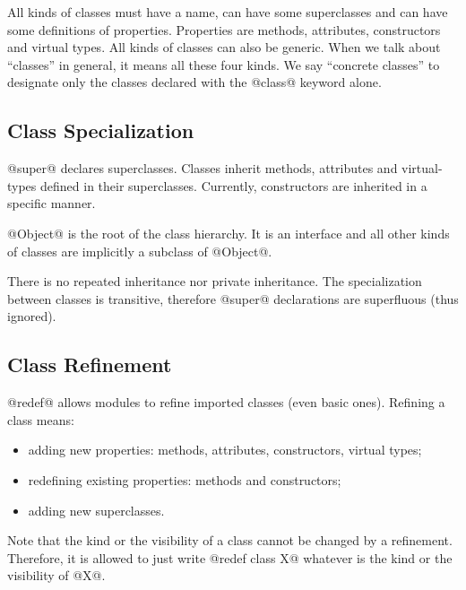 All kinds of classes must have a name, can have some superclasses and can have some definitions of properties.
Properties are methods, attributes, constructors and virtual types.
All kinds of classes can also be generic.
When we talk about ``classes'' in general, it means all these four kinds.
We say ``concrete classes'' to designate only the classes declared with the @class@ keyword alone.

\subsection{Class Specialization}\label{superclass}

@super@ declares superclasses.
Classes inherit methods, attributes and virtual-types defined in their superclasses.
Currently, constructors are inherited in a specific manner.

@Object@ is the root of the class hierarchy.
It is an interface and all other kinds of classes are implicitly a subclass of @Object@.

There is no repeated inheritance nor private inheritance.
The specialization between classes is transitive, therefore @super@ declarations are superfluous (thus ignored).

\subsection{Class Refinement}\label{refine}

@redef@ allows modules to refine imported classes (even basic ones).
Refining a class means:
\begin{itemize}
\item adding new properties: methods, attributes, constructors, virtual types;
\item redefining existing properties: methods and constructors;
\item adding new superclasses.
\end{itemize}

Note that the kind or the visibility of a class cannot be changed by a refinement.
Therefore, it is allowed to just write @redef class X@ whatever is the kind or the visibility of @X@.

